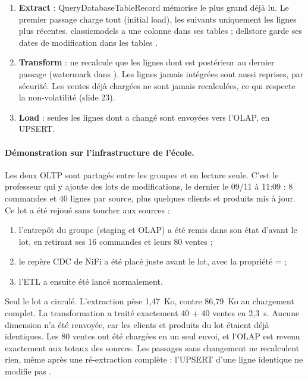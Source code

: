 \documentclass[11pt,a4paper]{article}
\begin{document}
\begin{enumerate}
  \item \textbf{Extract} : QueryDatabaseTableRecord mémorise le plus grand  déjà
  lu. Le premier passage charge tout (initial load), les suivants uniquement les lignes plus
  récentes. classicmodels a une colonne  dans ses tables ; dellstore garde ses
  dates de modification dans les tables .
  \item \textbf{Transform} :  ne recalcule que les lignes dont 
  est postérieur au dernier passage (watermark dans ). Les lignes jamais
  intégrées sont aussi reprises, par sécurité. Les ventes déjà chargées ne sont jamais
  recalculées, ce qui respecte la non-volatilité (slide 23).
  \item \textbf{Load} : seules les lignes  dont  a changé sont envoyées
  vers l'OLAP, en UPSERT.
\end{enumerate}

\paragraph{Démonstration sur l'infrastructure de l'école.} Les deux OLTP sont partagés entre
les groupes et en lecture seule. C'est le professeur qui y ajoute des lots de modifications, le
dernier le 09/11 à 11:09 : 8 commandes et 40 lignes par source, plus quelques clients et produits
mis à jour. Ce lot a été rejoué sans toucher aux sources :
\begin{enumerate}
  \item l'entrepôt du groupe (staging et OLAP) a été remis dans son état d'avant le lot, en
  retirant ses 16 commandes et leurs 80 ventes ;
  \item le repère CDC de NiFi a été placé juste avant le lot, avec la propriété
   =  ;
  \item l'ETL a ensuite été lancé normalement.
\end{enumerate}
Seul le lot a circulé. L'extraction  pèse 1,47~Ko, contre 86,79~Ko au
chargement complet. La transformation a traité exactement 40 + 40 ventes en 2,3~s. Aucune dimension
n'a été renvoyée, car les clients et produits du lot étaient déjà identiques. Les 80 ventes ont été
chargées en un seul envoi, et l'OLAP est revenu exactement aux totaux des sources. Les passages
sans changement ne recalculent rien, même après une ré-extraction complète : l'UPSERT d'une ligne
identique ne modifie pas .
\end{document}
